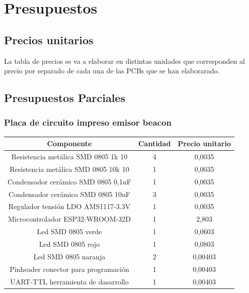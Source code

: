 \documentclass[a4paper ,12pt, onecolumn]{article}
\begin{document}
\section{Presupuestos}
    \subsection{Precios unitarios}
        La tabla de precios se va a elaborar en distintas unidades que corresponden al precio por separado de cada
        una de las PCBs que se han elaborarado.
    \subsection{Presupuestos Parciales}
            \subsubsection{Placa de circuito impreso emisor beacon}
                \begin{center}
                    \begin{tabular}{||c | c |c ||} 
                    \hline
                    Componente & Cantidad & Precio unitario  \\ [0.5ex] 
                    \hline\hline
                    Resistencia metálica SMD 0805 1k 10 & 4 & 0,0035 \\ 
                    Resistencia metálica SMD 0805 10k 10  & 1 & 0,0035 \\ 
                    Condensador cerámico SMD 0805 0,1uF  & 1 & 0,0035 \\ 
                    Condensador cerámico SMD 0805 10uF  & 3 & 0,0035 \\ 
                    Regulador tensión LDO AMS1117-3.3V  & 1 & 0,0035 \\ 
                    Microcontrolador ESP32-WROOM-32D   & 1 & 2,803 \\ 
                    Led SMD 0805 verde& 1 & 0,0603 \\ 
                    Led SMD 0805 rojo& 1 & 0,0803 \\ 
                    Led SMD 0805 naranja & 2 & 0,00403 \\ 
                    Pinheader conector para programación & 1 & 0,00403 \\ 
                    UART-TTL herramienta de dasarrollo & 1 & 0,00403 \\ 
                \hline
                    \end{tabular}
                \end{center}
\end{document}
